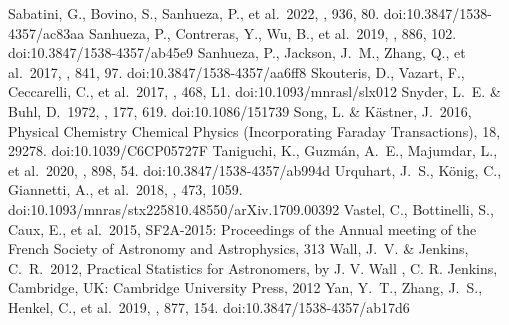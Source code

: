 \documentclass[twocolumn, twocolappendix]{aastex631}
\begin{document}
\begin{thebibliography}{}
 Sabatini, G., Bovino, S., Sanhueza, P., et al.\ 2022, \apj, 936, 80. doi:10.3847/1538-4357/ac83aa %
 Sanhueza, P., Contreras, Y., Wu, B., et al.\ 2019, \apj, 886, 102. doi:10.3847/1538-4357/ab45e9
 Sanhueza, P., Jackson, J.~M., Zhang, Q., et al.\ 2017, \apj, 841, 97. doi:10.3847/1538-4357/aa6ff8
 Skouteris, D., Vazart, F., Ceccarelli, C., et al.\ 2017, \mnras, 468, L1. doi:10.1093/mnrasl/slx012
 Snyder, L.~E. \& Buhl, D.\ 1972, \apj, 177, 619. doi:10.1086/151739
 Song, L. \& K{\"a}stner, J.\ 2016, Physical Chemistry Chemical Physics (Incorporating Faraday Transactions), 18, 29278. doi:10.1039/C6CP05727F
 Taniguchi, K., Guzm{\'a}n, A.~E., Majumdar, L., et al.\ 2020, \apj, 898, 54. doi:10.3847/1538-4357/ab994d
 Urquhart, J.~S., K{\"o}nig, C., Giannetti, A., et al.\ 2018, \mnras, 473, 1059. doi:10.1093/mnras/stx225810.48550/arXiv.1709.00392
 Vastel, C., Bottinelli, S., Caux, E., et al.\ 2015, SF2A-2015: Proceedings of the Annual meeting of the French Society of Astronomy and Astrophysics, 313 %
 Wall, J.~V. \& Jenkins, C.~R.\ 2012, Practical Statistics for Astronomers, by J. V. Wall , C. R. Jenkins, Cambridge, UK: Cambridge University Press, 2012
 Yan, Y.~T., Zhang, J.~S., Henkel, C., et al.\ 2019, \apj, 877, 154. doi:10.3847/1538-4357/ab17d6
\end{thebibliography}{}


\end{document}
